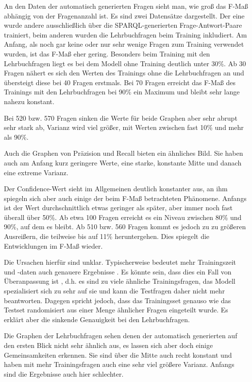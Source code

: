\documentclass[utf8,biblatex]{lni}
\begin{document}
An den Daten der automatisch generierten Fragen sieht man, wie groß das F-Maß abhängig von der Fragenanzahl ist.
Es sind zwei Datensätze dargestellt.
Der eine wurde andere ausschließlich über die SPARQL-generierten Frage-Antwort-Paare trainiert, beim anderen wurden die Lehrbuchfragen beim Training inkludiert.
Am Anfang, als noch gar keine oder nur sehr wenige Fragen zum Training verwendet wurden, ist das F-Maß eher gering.
Besonders beim Training mit den Lehrbuchfragen liegt es bei dem Modell ohne Training deutlich unter 30\%.
Ab 30 Fragen nähert es sich den Werten des Trainings ohne die Lehrbuchfragen an und übersteigt diese bei 40 Fragen erstmals.
Bei 70 Fragen erreicht das F-Maß des Trainings mit den Lehrbuchfragen bei 90\% ein Maximum und bleibt sehr lange nahezu konstant.

Bei 520 bzw. 570 Fragen sinken die Werte für beide Graphen aber sehr abrupt sehr stark ab, Varianz wird viel größer,
mit Werten zwischen fast 10\% und mehr als 90\%.

Auch die Graphen von Präzision und Recall bieten ein ähnliches Bild.
Sie haben auch am Anfang kurz geringere Werte, eine starke, konstante Mitte und danach eine extreme Varianz.

Der Confidence-Wert sieht im Allgemeinen deutlich konstanter aus, an ihm spiegeln sich aber auch einige der beim F-Maß betrachteten Phänomene.
Anfangs ist der Wert durchschnittlich etwas geringer als später, aber immer noch fast überall über 50\%.
Ab etwa 100 Fragen erreicht es ein Niveau zwischen 80\% und 90\%, auf dem es bleibt.
Ab 510 bzw. 560 Fragen kommt es jedoch zu zu größeren Ausreißern, die teilweise bis auf 11\% heruntergehen.
Dies spiegelt die Entwicklungen im F-Maß wieder.

Die Ursachen hierfür sind unklar.
Typischerweise bedeutet mehr Trainingszeit und -daten auch genauere Ergebnisse \cite{lernkurve}.
Es könnte sein, dass dies ein Fall von Überanpassung ist \cite{overunderfitting}, d.h. es sind zu viele ähnliche Trainingsfragen,
das Modell spezialisiert sich zu sehr auf sie und kann die Testfragen daher nicht mehr beantworten.
Dagegen spricht jedoch, dass das Trainingsset genauso wie das Testset randomisiert aus einer Menge ähnlicher Fragen eingeteilt wurde.
Es erklärt aber die sinkende Genauigkeit bei den Lehrbuchfragen.

Die Graphen der Lehrbuchfragen sehen denen der automatisch generierten auf den ersten Blick nicht sehr ähnlich aus,
es lassen sich aber doch einige Gemeinsamkeiten erkennen.
Sie sind über die Mitte auch recht konstant und haben mit mehr Trainingsfragen auch eine sehr viel größere Varianz.
Anfangs sind die Ergebnisse auch hier schlechter.
\end{document}
